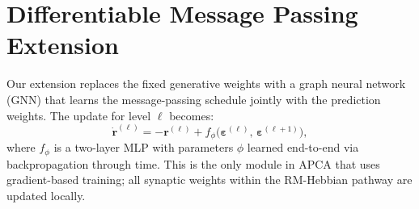 \section{Differentiable Message Passing Extension}

Our extension replaces the fixed generative weights with a graph neural network (GNN)
that learns the message-passing schedule jointly with the prediction weights.  The
update for level $\ell$ becomes:
\begin{equation}
  \dot{\mathbf{r}}^{(\ell)} = -\mathbf{r}^{(\ell)}
    + f_\phi\!\bigl(\boldsymbol{\varepsilon}^{(\ell)},\,\boldsymbol{\varepsilon}^{(\ell+1)}\bigr),
  \label{eq:dmp}
\end{equation}
where $f_\phi$ is a two-layer MLP with parameters $\phi$ learned end-to-end via
backpropagation through time.  This is the only module in APCA that uses
gradient-based training; all synaptic weights within the RM-Hebbian pathway are
updated locally.
